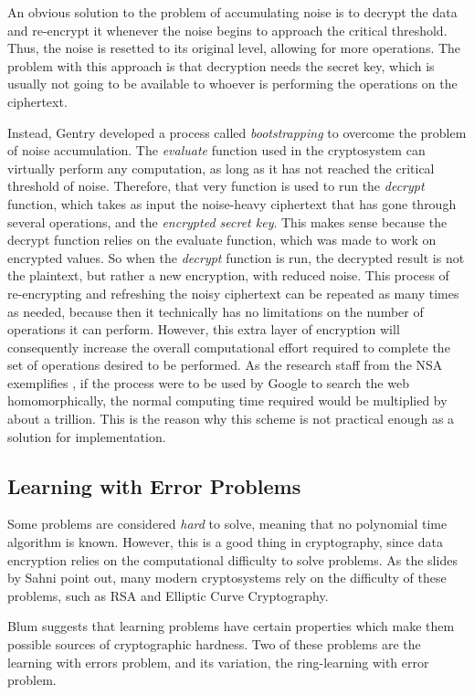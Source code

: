 An obvious solution to the problem of accumulating noise is to decrypt the data and re-encrypt it whenever the noise begins to approach the critical threshold. Thus, the noise is resetted to its original level, allowing for more operations. The problem with this approach is that decryption needs the secret key, which is usually not going to be available to whoever is performing the operations on the ciphertext. 

Instead, Gentry developed a process called \emph{bootstrapping} to overcome the problem of noise accumulation. The \emph{evaluate} function used in the cryptosystem can virtually perform any computation, as long as it has not reached the critical threshold of noise. Therefore, that very function is used to run the \emph{decrypt} function, which takes as input the noise-heavy ciphertext that has gone through several operations, and the \emph{encrypted secret key}. This makes sense because the decrypt function relies on the evaluate function, which was made to work on encrypted values. So when the \emph{decrypt} function is run, the decrypted result is not the plaintext, but rather a new encryption, with reduced noise. This process of re-encrypting and refreshing the noisy ciphertext can be repeated as many times as needed, because then it technically has no limitations on the number of operations it can perform. However, this extra layer of encryption will consequently increase the overall computational effort required to complete the set of operations desired to be performed. As the research staff from the NSA exemplifies \cite{NSA2014}, if the process were to be used by Google to search the web homomorphically, the normal computing time required would be multiplied by about a trillion. This is the reason why this scheme is not practical enough as a solution for implementation.

\subsection{Learning with Error Problems}

Some problems are considered \emph{hard} to solve, meaning that no polynomial time algorithm is known. However, this is a good thing in cryptography, since data encryption relies on the computational difficulty to solve problems. As the slides by Sahni \cite{sahni1999} point out, many modern cryptosystems rely on the difficulty of these problems, such as RSA and Elliptic Curve Cryptography.

Blum \cite{Blum:1993:CPB:646758.759585} suggests that learning problems have certain properties which make them possible sources of cryptographic hardness. Two of these problems are the learning with errors problem, and its variation, the ring-learning with error problem.

